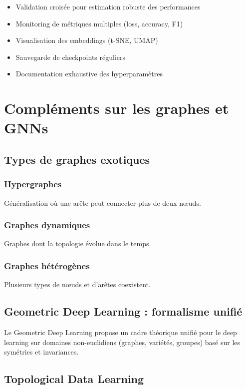 \begin{itemize}
    \item Validation croisée pour estimation robuste des performances
    \item Monitoring de métriques multiples (loss, accuracy, F1)
    \item Visualisation des embeddings (t-SNE, UMAP)
    \item Sauvegarde de checkpoints réguliers
    \item Documentation exhaustive des hyperparamètres
\end{itemize}

\chapter{Compléments sur les graphes et GNNs}

\section{Types de graphes exotiques}

\subsection{Hypergraphes}
Généralisation où une arête peut connecter plus de deux nœuds.

\subsection{Graphes dynamiques}
Graphes dont la topologie évolue dans le temps.

\subsection{Graphes hétérogènes}
Plusieurs types de nœuds et d'arêtes coexistent.

\section{Geometric Deep Learning : formalisme unifié}

Le Geometric Deep Learning propose un cadre théorique unifié pour le deep learning sur domaines non-euclidiens (graphes, variétés, groupes) basé sur les symétries et invariances.

\section{Topological Data Learning}

